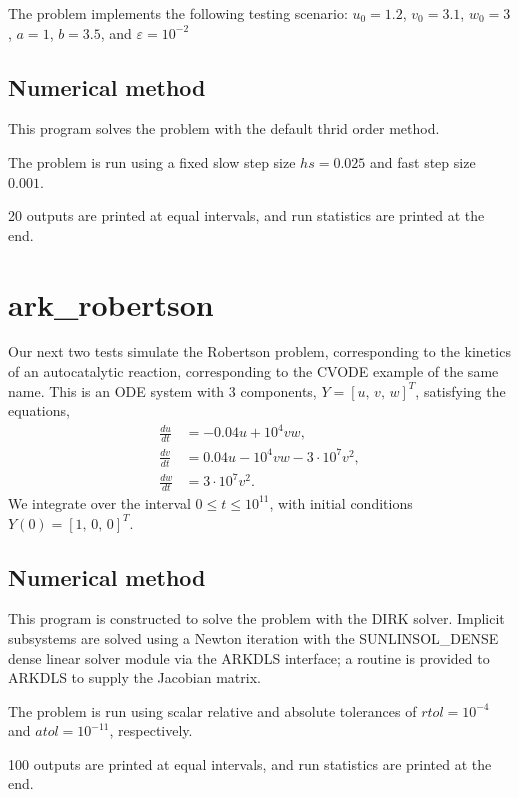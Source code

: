 \documentclass[letterpaper,10pt,english]{sphinxmanual}
\begin{document}
The problem implements the following testing scenario: \(u_0=1.2\),
\(v_0=3.1\),  \(w_0=3\), \(a=1\), \(b=3.5\), and
\(\varepsilon=10^{-2}\)


\subsection{Numerical method}
\label{\detokenize{c_serial:id11}}
This program solves the problem with the default thrid order method.

The problem is run using a fixed slow step size \(hs=0.025\) and fast step
size \(0.001\).

20 outputs are printed at equal intervals, and run statistics
are printed at the end.


\section{ark\_robertson}
\label{\detokenize{c_serial:ark-robertson}}\label{\detokenize{c_serial:id12}}
Our next two tests simulate the Robertson problem, corresponding to the
kinetics of an autocatalytic reaction, corresponding to the CVODE
example of the same name.  This is an ODE system with 3
components, \(Y = [u,\, v,\, w]^T\), satisfying the equations,
\begin{equation*}
\begin{split}\frac{du}{dt} &= -0.04 u + 10^4 v w, \\
\frac{dv}{dt} &= 0.04 u - 10^4 v w - 3\cdot10^7 v^2, \\
\frac{dw}{dt} &= 3\cdot10^7 v^2.\end{split}
\end{equation*}
We integrate over the interval \(0\le t\le 10^{11}\), with initial
conditions  \(Y(0) = [1,\, 0,\, 0]^T\).


\subsection{Numerical method}
\label{\detokenize{c_serial:id13}}
This program is constructed to solve the problem with the DIRK solver.
Implicit subsystems are solved using a Newton iteration with the
SUNLINSOL\_DENSE dense linear solver module via the ARKDLS interface; a
routine is provided to ARKDLS to supply the Jacobian matrix.

The problem is run using scalar relative and absolute tolerances of
\(rtol=10^{-4}\) and \(atol=10^{-11}\), respectively.

100 outputs are printed at equal intervals, and run statistics are
printed at the end.
\end{document}
